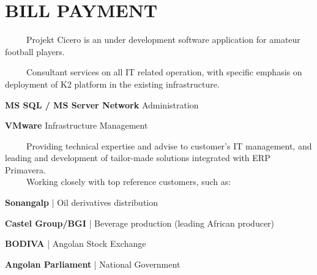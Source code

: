\documentclass[letterpaper]{deedy-resume} %
\begin{document}
\begin{minipage}[t]{0.66\textwidth}

\section{BILL PAYMENT}


\-\	\ \ \ \ Projekt Cicero is an under development software application for amateur football players.

\sectionspace


\-\	\ \ \ \ Consultant services on all IT related operation, with specific emphasis on deployment of K2 platform in the existing infrastructure. \\
\vspace{\topsep}
\begin{tightitemize}
	\item \textbf{MS SQL / MS Server Network} Administration
	\item \textbf{VMware} Infrastructure Management
\end{tightitemize}

\sectionspace


\-\	\ \ \ \ Providing technical expertise and advise to customer's IT management, and leading and development of tailor-made solutions integrated with ERP Primavera.\\
\-\	\ \ \ \ Working closely with top reference customers, such as:\\
\begin{tightitemize}
	\item \textbf{Sonangalp} | Oil derivatives distribution
	\item \textbf{Castel Group/BGI} | Beverage production (leading African producer)
	\item \textbf{BODIVA} | Angolan Stock Exchange
	\item \textbf{Angolan Parliament} | National Government
\end{tightitemize}

\sectionspace



\end{minipage}
\end{document}
